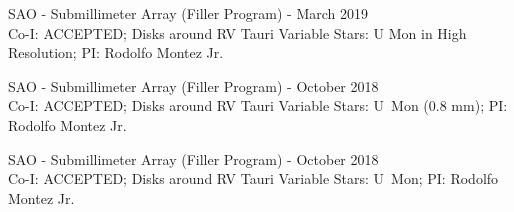 \documentclass[letter,11pt]{article}
\begin{document}
\begin{etaremune}
\item SAO - Submillimeter Array (Filler Program) - March 2019 \\
Co-I: ACCEPTED; Disks around RV Tauri Variable Stars: U Mon in High Resolution; PI: Rodolfo Montez Jr.

\item SAO - Submillimeter Array (Filler Program) - October 2018 \\
Co-I: ACCEPTED; Disks around RV Tauri Variable Stars: U~Mon (0.8 mm); PI: Rodolfo Montez Jr.






\item SAO - Submillimeter Array (Filler Program) - October 2018 \\
Co-I: ACCEPTED; Disks around RV Tauri Variable Stars: U~Mon; PI: Rodolfo Montez Jr.



\end{etaremune}
\end{document}
